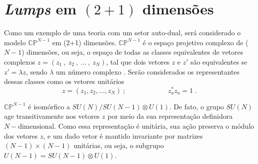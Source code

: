\chapter[\textit{Lumps} em $(2+1)$ dimensões]{\textit{Lumps} em $(2+1)$ dimensões}
\label{Lumps (2+1)}

Como um exemplo de uma teoria com um setor auto-dual, será considerado o modelo $\mathbb{CP}^{N-1}$ em (2+1) dimensões. $\mathbb{CP}^{N-1}$ é o espaço projetivo complexo de ($N-1$) dimensões, ou seja, o espaço de todas as classes equivalentes de vetores complexos $z = \left(z_1 \ , \ z_2 \ , \ ... \ , \ z_N\right)$, tal que dois vetores $z$ e $z'$ são equivalentes se $z' = \lambda z$, sendo $\lambda$ um número complexo \cite{sigmamodelinst, lowsigma}. Serão considerados os representantes dessas classes como os vetores unitários
\begin{equation}
    z = (z_1,z_2,...,z_N) \ ; \qquad \qquad \qquad z^{*}_a z_a = 1 \ .
\end{equation}

$\mathbb{CP}^{N-1}$ é isomórfico a $SU(N)/SU(N-1) \otimes U(1)$. De fato, o grupo $SU(N)$ age transitivamente nos vetores $z$ por meio da sua representação definidora $N-\text{dimensional}$. Como essa representação é unitária, sua ação preserva o módulo dos vetores $z$, e um dado vetor é mantido invariante por matrizes $(N-1)\times(N-1)$ unitárias, ou seja, o subgrupo $U(N-1) = SU(N-1)\otimes U(1)$.


